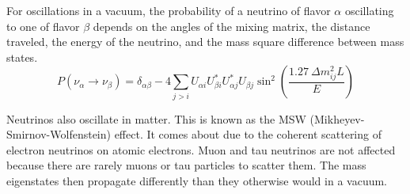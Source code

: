	For oscillations in a vacuum, the probability of a neutrino of flavor $\alpha$ oscillating to one of flavor $\beta$ depends on the angles of the mixing matrix, the distance traveled, the energy of the neutrino, and the mass square difference between mass states\cite{PDG}.
	\begin{equation}
		P(\nu_\alpha \rightarrow \nu_\beta) = \delta_{\alpha\beta} - 4 \sum_{j>i} U_{\alpha i} U_{\beta i}^* U_{\alpha j}^* U_{\beta j} \sin^2\left(\frac{1.27 \ \Delta m_{ij}^2 L}{E}\right)
	\end{equation}

	Neutrinos also oscillate in matter. This is known as the MSW (Mikheyev-Smirnov-Wolfenstein) effect\cite{mkw}. It comes about due to the coherent scattering of electron neutrinos on atomic electrons. Muon and tau neutrinos are not affected because there are rarely muons or tau particles to scatter them. The mass eigenstates then propagate differently than they otherwise would in a vacuum. 
